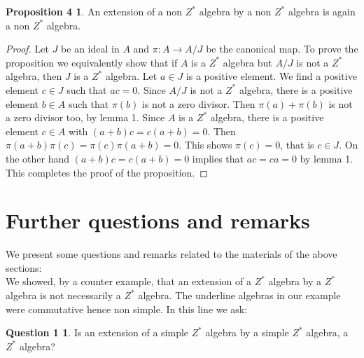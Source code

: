 \documentclass[a4paper,10pt]{amsart}
\theoremstyle{definition}
\newtheorem*{prop4}{Proposition   4}
\newtheorem*{question1}{Question   1}
\theoremstyle{plain}
\begin{document}
\begin{prop4}
 An extension of  a non $Z^{*}$ algebra by  a  non  $Z^{*}$ algebra is  again  a non $Z^{*}$  algebra.
 \end{prop4}
\begin{proof}
Let $J$  be  an ideal in $A$ and $\pi: A \rightarrow A/J$ be  the  canonical map. To prove the proposition we equivalently show that if $A$ is  a $Z^{*}$  algebra  but $A/J$ is  not  a  $Z^{*}$  algebra, then $J$ is  a $Z^{*}$  algebra. Let $a\in J$ is  a positive  element. We find  a positive  element $c\in J$  such that $ac=0$. Since $A/J$  is  not  a $Z^{*}$  algebra, there is  a positive  element $b \in A$ such that  $\pi (b)$ is  not  a zero divisor. Then $\pi (a)+ \pi (b)$ is  not  a zero divisor too, by lemma 1. Since $A$ is  a  $Z^{*}$ algebra, there is  a positive element $c \in A$ with  $(a+b)c=c(a+b)=0$. Then $\pi(a+b) \pi (c)=\pi(c) \pi(a+b) =0$. This  shows $\pi(c)=0$, that is
$c\in J$. On the other hand $(a+b)c=c(a+b)=0$ implies  that $ac=ca=0$ by lemma 1. This  completes the  proof  of the proposition.
\end{proof}
\section*{Further questions and remarks}
We present  some  questions and remarks related to the materials of the above  sections: \\

We showed, by  a counter example, that an extension of a $Z^{*}$ algebra by  a $Z^{*}$ algebra is not necessarily a $Z^{*}$  algebra. The underline  algebras in our example were commutative hence non simple. In this line we ask:\\
\begin{question1}
Is an extension of a simple $Z^{*}$ algebra by  a simple $Z^{*}$  algebra,  a $Z^{*}$ algebra?
\end{question1}
\end{document}
